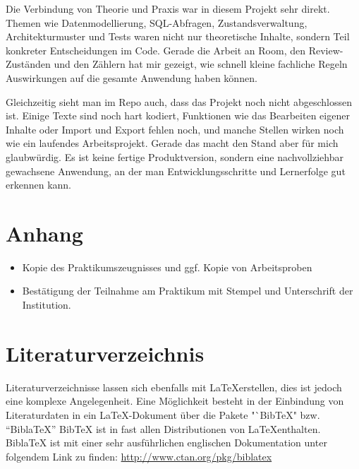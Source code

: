 \documentclass{Vorlage}
\begin{document}
Die Verbindung von Theorie und Praxis war in diesem Projekt sehr direkt. Themen wie Datenmodellierung, SQL-Abfragen, Zustandsverwaltung, Architekturmuster und Tests waren nicht nur theoretische Inhalte, sondern Teil konkreter Entscheidungen im Code. Gerade die Arbeit an Room, den Review-Zust\"anden und den Z\"ahlern hat mir gezeigt, wie schnell kleine fachliche Regeln Auswirkungen auf die gesamte Anwendung haben k\"onnen.

Gleichzeitig sieht man im Repo auch, dass das Projekt noch nicht abgeschlossen ist. Einige Texte sind noch hart kodiert, Funktionen wie das Bearbeiten eigener Inhalte oder Import und Export fehlen noch, und manche Stellen wirken noch wie ein laufendes Arbeitsprojekt. Gerade das macht den Stand aber f\"ur mich glaubw\"urdig. Es ist keine fertige Produktversion, sondern eine nachvollziehbar gewachsene Anwendung, an der man Entwicklungsschritte und Lernerfolge gut erkennen kann.


\newpage

\section{Anhang}

\begin{itemize}

\item Kopie des Praktikumszeugnisses und ggf. Kopie von Arbeitsproben

\item Best\"atigung der Teilnahme am Praktikum mit Stempel und Unterschrift der Institution.

\end{itemize}

\newpage

\section{Literaturverzeichnis}

Literaturverzeichnisse lassen sich ebenfalls mit \LaTeX erstellen, dies ist jedoch eine komplexe Angelegenheit. Eine M\"oglichkeit besteht in der Einbindung von Literaturdaten in ein \LaTeX-Dokument \"uber die Pakete "`BibTeX" bzw. "`BiblaTeX"' BibTeX ist in fast allen Distributionen von \LaTeX enthalten. BiblaTeX ist mit einer sehr ausf\"uhrlichen englischen Dokumentation unter folgendem Link zu finden: \url{http://www.ctan.org/pkg/biblatex}
\end{document}
